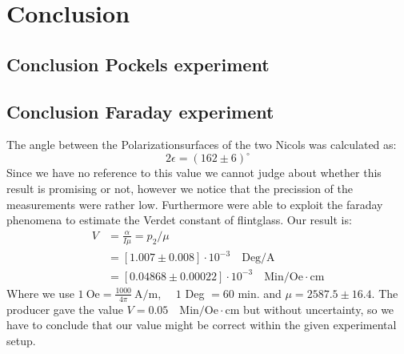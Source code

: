 \section{Conclusion}
\subsection{Conclusion Pockels experiment}
\subsection{Conclusion Faraday experiment}
The angle between the Polarizationsurfaces of the two Nicols was calculated as:\\
\begin{equation*}
2\epsilon = (162\pm 6) ^{\circ} 
\end{equation*}
Since we have no reference to this value we cannot judge about whether this result is promising
or not, however we notice that the precission of the measurements were rather low.
Furthermore were able to exploit the
faraday phenomena to estimate the Verdet constant of flintglass.
Our result is:
\begin{align*}
    V &= \frac{\alpha}{I\mu}   = p_2 / \mu \\
      &= \left [ 1.007 \pm 0.008 \right ]\cdot 10^{-3} \quad \mathrm{Deg/A} \\
      &= \left [ 0.04868 \pm 0.00022 \right ] \cdot 10^{-3} \quad \mathrm{Min/Oe\cdot cm}
\end{align*}
Where we use $1\ \mathrm{Oe} = \frac{1000}{4\pi}\ \mathrm{A/m}$, $\quad1$ Deg $=60$ min. and $\mu = 2587.5\pm16.4$.
The producer gave the value $V = 0.05 \quad \mathrm{Min/Oe \cdot cm}$ but without uncertainty, so
we have to conclude that our value might be correct within the given experimental setup. 
